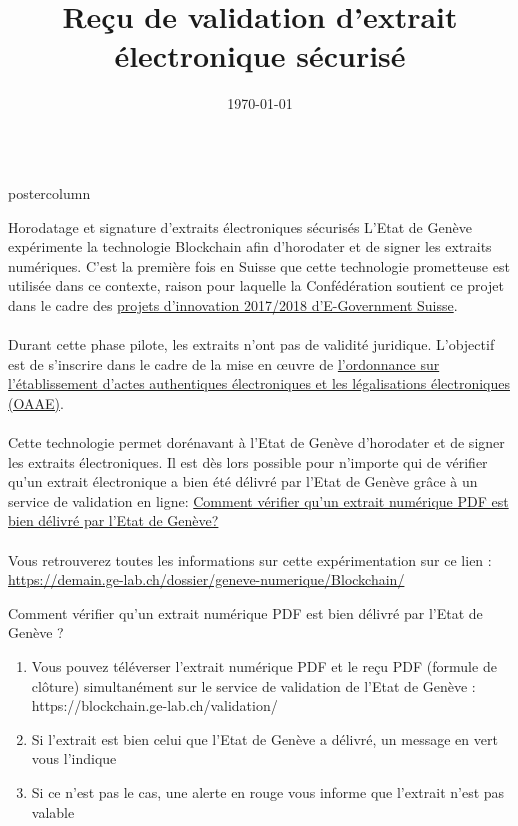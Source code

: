 \documentclass[roundedcorners=true, titleposition=center]{beamerthemeruhuisstijlposter}
\title{Reçu de validation d’extrait électronique sécurisé}
\date{\today}
\begin{document}
\begin{frame}
\begin{columns}
\begin{column}{0.95\textwidth}
\begin{beamercolorbox}[center, wd=\textwidth]{postercolumn}
\begin{minipage}[T]{0.95\textwidth}
\parbox[t][\columnheight]{\textwidth}{%
\begin{block}{Horodatage et signature d'extraits électroniques sécurisés}
L'Etat de Genève expérimente la technologie Blockchain afin d'horodater et de signer les extraits numériques. C'est la première fois en Suisse que cette technologie prometteuse est utilisée dans ce contexte, raison pour laquelle la Confédération soutient ce projet dans le cadre des \href{https://www.egovernment.ch/fr/umsetzung/innovationen/innovations-20172018/}{projets d'innovation 2017/2018 d'E-Government Suisse}.
\\
\\
Durant cette phase pilote, les extraits n'ont pas de validité juridique. L'objectif est de s'inscrire dans le cadre de la mise en œuvre de \href{https://www.admin.ch/opc/fr/classified-compilation/20111505/201701010000/943.033.pdf}{l'ordonnance sur l'établissement d'actes authentiques électroniques et les légalisations électroniques (OAAE)}.
\\
\\
Cette technologie permet dorénavant à l'Etat de Genève d'horodater et de signer les extraits électroniques. Il est dès lors possible pour n'importe qui de vérifier qu'un extrait électronique a bien été délivré par l'Etat de Genève grâce à un service de validation en ligne: \href{https://blockchain.ge-lab.ch/validation/}{Comment vérifier qu'un extrait numérique PDF est bien délivré par l'Etat de Genève?}
\\
\\
Vous retrouverez toutes les informations sur cette expérimentation sur ce lien : \href{https://demain.ge-lab.ch/dossier/geneve-numerique/Blockchain/}{https://demain.ge-lab.ch/dossier/geneve-numerique/Blockchain/}
\end{block}
\medskip
\begin{block}{Comment vérifier qu'un extrait numérique PDF est bien délivré par l'Etat de Genève ?}
\begin{enumerate}
\item Vous pouvez téléverser l'extrait numérique PDF et le reçu PDF (formule de clôture) simultanément sur le service de validation de l'Etat de Genève : https://blockchain.ge-lab.ch/validation/
\item Si l'extrait est bien celui que l'Etat de Genève a délivré, un message en vert vous l'indique
\item Si ce n'est pas le cas, une alerte en rouge vous informe que l'extrait n'est pas valable
\end{enumerate}
\end{block}
}
\end{minipage}
\end{beamercolorbox}
\end{column}
\end{columns}
\end{frame}
\end{document}
